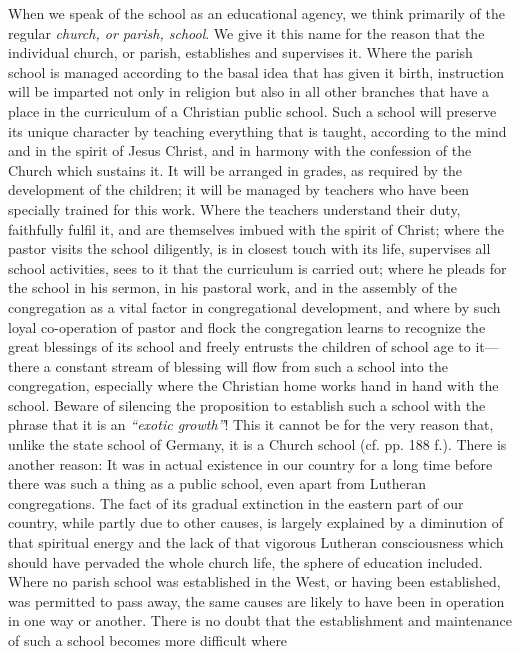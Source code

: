 When we speak of the school as an educational agency, we think primarily of the regular \emph{church, or parish, school}. We give it this name for the reason that the individual church, or parish, establishes and supervises it. Where the parish school is managed according to the basal idea that has given it birth, instruction will be imparted not only in religion but also in all other branches that have a place in the curriculum of a Christian public school. Such a school will preserve its unique character by teaching everything that is taught, according to the mind and in the spirit of Jesus
Christ, and in harmony with the confession of the Church which sustains it. It will be arranged in grades, as required by the development of the children; it will be managed by teachers who have been specially trained for this work. Where the teachers understand their duty, faithfully fulfil it, and are themselves imbued with the spirit of Christ; where the pastor visits the school diligently, is in closest touch with its life, supervises all school activities, sees to it that the curriculum is carried out; where he pleads for the school in his sermon, in his pastoral work, and in the assembly of the congregation as a vital factor in congregational development, and where by such loyal co-operation of pastor and flock the congregation learns to recognize the great blessings of its school and freely entrusts the children of school age to it—there a constant stream of blessing will flow from such a school into the congregation, especially where the Christian home works hand in hand with the school. Beware of silencing the proposition to establish such a school with the phrase that it is an \emph{“exotic growth”}! This it cannot be for the very reason that, unlike the state school of Germany, it is a Church school (cf. pp. 188 f.). There is another reason: It was in actual existence in our country for a long time before there was such a thing as a public school, even apart from Lutheran congregations. The fact of its gradual extinction in the eastern part of our country, while partly due to other causes, is largely explained by a diminution of that spiritual energy and the lack of that vigorous Lutheran consciousness which should have pervaded the whole church life, the sphere of education included. Where no parish school was established in the West, or having been established, was permitted to pass away, the same causes are likely to have been in operation in one way or another. There is no doubt that the establishment and maintenance of such a school becomes more difficult where

